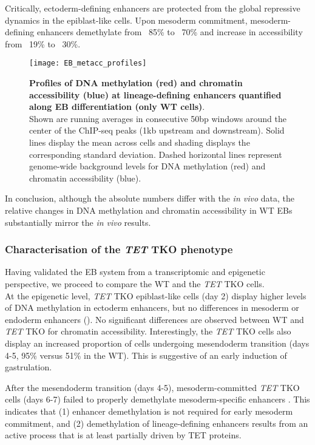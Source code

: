 Critically, ectoderm-defining enhancers are protected from the global repressive dynamics in the epiblast-like cells. Upon mesoderm commitment, mesoderm-defining enhancers demethylate from ~85\% to ~70\% and increase in accessibility from ~19\% to ~30\%.

\begin{figure}[H]
	\centering
	\texttt{[image: EB\_metacc\_profiles]}
	\caption[]{
	\textbf{Profiles of DNA methylation (red) and chromatin accessibility (blue) at lineage-defining enhancers quantified along EB differentiation (only WT cells)}.\\
	Shown are running averages in consecutive 50bp windows around the center of the ChIP-seq peaks (1kb upstream and downstream). Solid lines display the mean across cells and shading displays the corresponding standard deviation. Dashed horizontal lines represent genome-wide background levels for DNA methylation (red) and chromatin accessibility (blue).
	}
	\label{fig:EB_metacc_profiles}
\end{figure}

In conclusion, although the absolute numbers differ with the \textit{in vivo} data, the relative changes in DNA methylation and chromatin accessibility in WT EBs substantially mirror the \textit{in vivo} results.

\subsubsection{Characterisation of the \textit{TET} TKO phenotype}

Having validated the EB system from a transcriptomic and epigenetic perspective, we proceed to compare the WT and the \textit{TET} TKO cells.\\
At the epigenetic level, \textit{TET} TKO epiblast-like cells (day 2) display higher levels of DNA methylation in ectoderm enhancers, but no differences in mesoderm or endoderm enhancers (). No significant differences are observed between WT and \textit{TET} TKO for chromatin accessibility. Interestingly, the \textit{TET} TKO cells also display an increased proportion of cells undergoing mesendoderm transition (days 4-5, 95\% versus 51\% in the WT). This is suggestive of an early induction of gastrulation.

After the mesendoderm transition (days 4-5), mesoderm-committed \textit{TET} TKO cells (days 6-7) failed to properly demethylate mesoderm-specific enhancers . This indicates that (1) enhancer demethylation is not required for early mesoderm commitment, and (2) demethylation of lineage-defining enhancers results from an active process that is at least partially driven by TET proteins.

